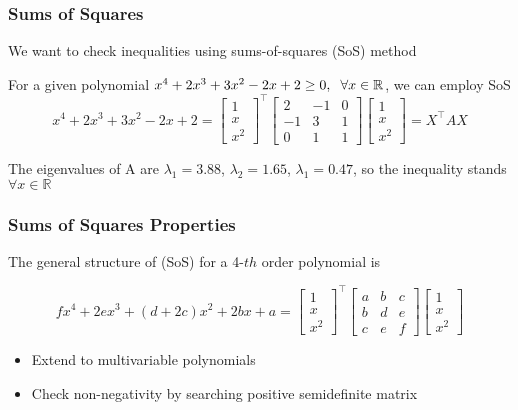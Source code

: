 \documentclass{beamer}
\begin{document}

\begin{frame}
\frametitle{Sums of Squares}
We want to check inequalities using sums-of-squares (SoS) method \vspace{.2cm}

For a given polynomial $x^4+2x^3+3x^2-2x+2 \geq 0, \hspace{.2cm} \forall x \in \mathbb{R}$, we can employ SoS
\begin{equation*}
x^4+2x^3+3x^2-2x+2= \begin{bmatrix}
1\\
x\\
x^2
\end{bmatrix}^{\intercal} \begin{bmatrix}
2 & -1 & 0\\
-1 & 3 & 1\\
0 & 1 & 1
\end{bmatrix} \begin{bmatrix}
1\\
x\\
x^2
\end{bmatrix} = X^{\intercal}AX
\end{equation*}

The eigenvalues of A are $\lambda_1=3.88$, $\lambda_2=1.65$, $\lambda_1=0.47$, so the inequality stands $\forall x \in \mathbb{R}$

\end{frame}


\begin{frame}
\frametitle{Sums of Squares Properties}
The general structure of (SoS) for a 4-$th$ order polynomial is \vspace{.2cm}

\begin{equation*}
fx^4+2ex^3+(d+2c)x^2+2bx+a= \begin{bmatrix}
1\\
x\\
x^2
\end{bmatrix}^{\intercal} \begin{bmatrix}
a & b & c\\
b & d & e\\
c & e & f
\end{bmatrix} \begin{bmatrix}
1\\
x\\
x^2
\end{bmatrix}
\end{equation*}

\begin{itemize}
\item Extend to multivariable polynomials
\item Check non-negativity by searching positive semidefinite matrix
\end{itemize}
\end{frame}
\end{document}
